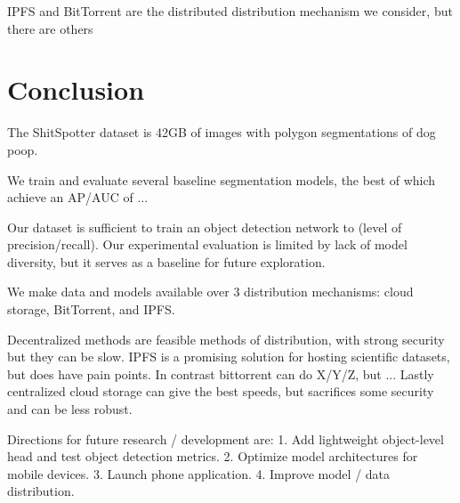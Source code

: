 \documentclass[10pt,twocolumn,letterpaper]{article}
\begin{document}
IPFS and BitTorrent are the distributed distribution mechanism we consider, but there are others


\section{Conclusion}

The ShitSpotter dataset is 42GB of images with polygon segmentations of dog
poop. 

We train and evaluate several baseline segmentation models, the best of which 
achieve an AP/AUC of ...

Our dataset is sufficient to train an object detection network to (level of
precision/recall).
Our experimental evaluation is limited by lack of model diversity, but it
serves as a baseline for future exploration.

We make data and models available over 3 distribution mechanisms: 
cloud storage, BitTorrent, and IPFS.

Decentralized methods are feasible methods of distribution, with strong
security but they can be slow.
IPFS is a promising solution for hosting scientific datasets, but does have pain points.
In contrast bittorrent can do X/Y/Z, but ...
Lastly centralized cloud storage can give the best speeds, but sacrifices some
security and can be less robust.

Directions for future research / development are:
1. Add lightweight object-level head and test object detection metrics.
2. Optimize model architectures for mobile devices.
3. Launch phone application.
4. Improve model / data distribution.


{\small


}
%


\begin{comment}
    cd $HOME/code/shitspotter
    python -m shitspotter.cli.coco_annotation_stats $HOME/data/dvc-repos/shitspotter_dvc/data.kwcoco.json \
        --dst_fpath $HOME/code/shitspotter/coco_annot_stats/stats.json \
        --dst_dpath $HOME/code/shitspotter/coco_annot_stats

    SeeAlso:
    ~/code/shitspotter/experiments/run_pixel_eval_pipeline.sh
    ~/code/shitspotter/experiments/run_pixel_eval_on_test_pipeline.sh

    python ~/code/shitspotter/dev/poc/estimate_train_resources.py

    See: ./localize_figures.sh
\end{comment}
\end{document}
